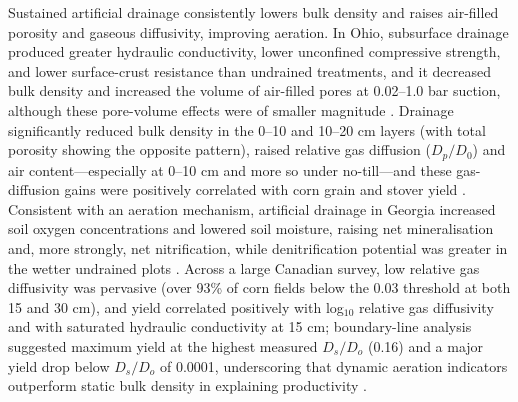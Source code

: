 Sustained artificial drainage consistently lowers bulk density and raises air-filled
porosity and gaseous diffusivity, improving aeration. In Ohio, subsurface drainage
produced greater hydraulic conductivity, lower unconfined compressive strength, and
lower surface-crust resistance than undrained treatments, and it decreased bulk
density and increased the volume of air-filled pores at 0.02--1.0 bar suction,
although these pore-volume effects were of smaller magnitude \parencite{HUNDAL1976}.
Drainage significantly reduced bulk density in the 0--10 and 10--20 cm layers (with
total porosity showing the opposite pattern), raised relative gas diffusion
($D_p/D_0$) and air content---especially at 0--10 cm and more so under no-till---and
these gas-diffusion gains were positively correlated with corn grain and stover yield
\parencite{Nakajima2014}. Consistent with an aeration mechanism, artificial drainage
in Georgia increased soil oxygen concentrations and lowered soil moisture, raising net
mineralisation and, more strongly, net nitrification, while denitrification potential
was greater in the wetter undrained plots \parencite{GROFFMAN1984}. Across a large
Canadian survey, low relative gas diffusivity was pervasive (over 93\% of corn fields
below the 0.03 threshold at both 15 and 30 cm), and yield correlated positively with
log$_{10}$ relative gas diffusivity and with saturated hydraulic conductivity at 15
cm; boundary-line analysis suggested maximum yield at the highest measured $D_s/D_o$
(0.16) and a major yield drop below $D_s/D_o$ of 0.0001, underscoring that dynamic
aeration indicators outperform static bulk density in explaining productivity
\parencite{Caron2025}.

